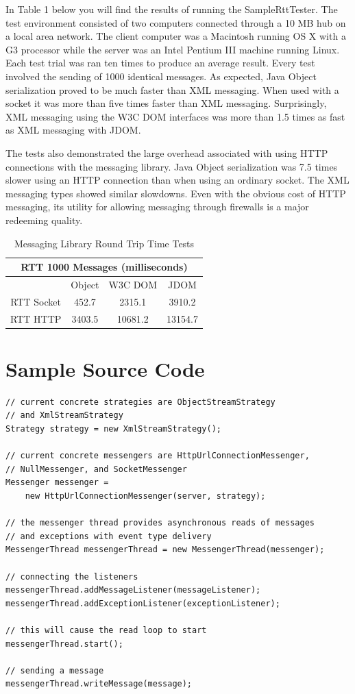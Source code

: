 \documentclass{article}
\begin{document}
In Table 1 below you will find the results of running the
SampleRttTester.  The test environment consisted of two computers
connected through a 10 MB hub on a local area network.  The client
computer was a Macintosh running OS X with a G3 processor while the
server was an Intel Pentium III machine running Linux.  Each test
trial was ran ten times to produce an average result.  Every test
involved the sending of 1000 identical messages.  As expected, Java
Object serialization proved to be much faster than XML messaging.
When used with a socket it was more than five times faster than XML
messaging.  Surprisingly, XML messaging using the W3C DOM interfaces
was more than 1.5 times as fast as XML messaging with JDOM.

The tests also demonstrated the large overhead associated with using HTTP
connections with the messaging library.  Java Object serialization was 7.5
times slower using an HTTP connection than when using an ordinary socket.  The
XML messaging types showed similar slowdowns.  Even with the obvious cost of
HTTP messaging, its utility for allowing messaging through firewalls is a major
redeeming quality.

\begin{table}[!hbp]
\centering
\begin{tabular}{|c|c|c|c|}
\hline
\multicolumn{4}{|c|}{RTT 1000 Messages (milliseconds)} \\
\hline
 & Object & W3C DOM & JDOM \\
\hline
RTT Socket & 452.7 & 2315.1 & 3910.2 \\
\hline
RTT HTTP & 3403.5 & 10681.2 & 13154.7 \\
\hline
\end{tabular}
\caption{Messaging Library Round Trip Time Tests}
\end{table}

\section{Sample Source Code}

\begin{verbatim}
// current concrete strategies are ObjectStreamStrategy
// and XmlStreamStrategy
Strategy strategy = new XmlStreamStrategy();

// current concrete messengers are HttpUrlConnectionMessenger,
// NullMessenger, and SocketMessenger
Messenger messenger =
    new HttpUrlConnectionMessenger(server, strategy);

// the messenger thread provides asynchronous reads of messages
// and exceptions with event type delivery
MessengerThread messengerThread = new MessengerThread(messenger);

// connecting the listeners
messengerThread.addMessageListener(messageListener);
messengerThread.addExceptionListener(exceptionListener);

// this will cause the read loop to start
messengerThread.start();

// sending a message
messengerThread.writeMessage(message);
\end{verbatim}
\end{document}
